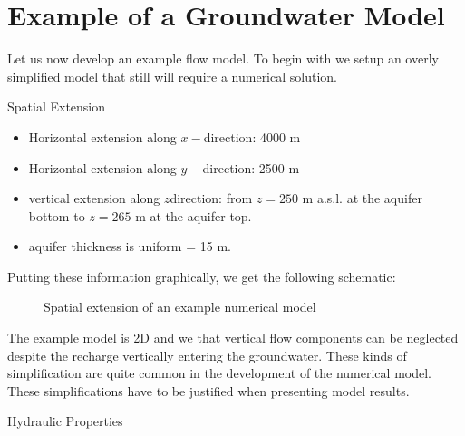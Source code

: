 \documentclass[letterpaper,10pt,english]{jupyterBook}
\begin{document}
\section{Example of a Groundwater Model}
\label{\detokenize{content/modeling/31_intro_modeling:example-of-a-groundwater-model}}
\sphinxAtStartPar
Let us now develop an example flow model. To begin with we set\sphinxhyphen{}up an overly simplified model that still will require a numerical solution.

\sphinxAtStartPar
{} \sphinxhyphen{} Spatial Extension
\begin{itemize}
\item {} 
\sphinxAtStartPar
Horizontal extension along \(x-\)direction: 4000 m

\item {} 
\sphinxAtStartPar
Horizontal extension along \(y-\)direction: 2500 m

\item {} 
\sphinxAtStartPar
vertical extension along \(z\)\sphinxhyphen{}direction: from \(z = 250\) m a.s.l. at the aquifer bottom to \(z= 265\) m at the aquifer top.

\item {} 
\sphinxAtStartPar
aquifer thickness is uniform = 15 m.

\end{itemize}

\sphinxAtStartPar
Putting these information graphically, we get the following schematic:

\begin{figure}[htbp]
\centering
\capstart

\noindent{}
\caption{Spatial extension of an example numerical model}\label{\detokenize{content/modeling/31_intro_modeling:nummodel-ex}}\end{figure}

\sphinxAtStartPar
The example model is 2D and we  that vertical flow components can be neglected despite the recharge vertically entering the groundwater. These kinds of simplification are quite common in the development of the numerical model. These simplifications have to be justified when presenting model results.

\sphinxAtStartPar
{} \sphinxhyphen{} Hydraulic Properties
\end{document}
